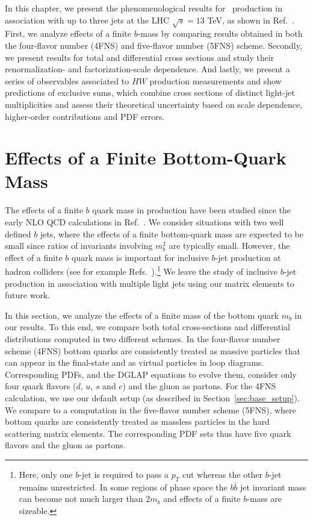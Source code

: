 In this chapter, we present the phenomenological results for
\Wbb~production in association with up to three jets at the LHC
$\sqrt{s}=13$ TeV, as shown in Ref.~\cite{wbbpaper}. First, we analyze
effects of a finite $b$-mass by comparing results obtained in both the
four-flavor number (4FNS) and five-flavor number (5FNS)
scheme. Secondly, we present results for total and differential cross
sections and study their renormalization- and factorization-scale
dependence. And lastly, we present a series of
observables associated to $HW$ production measurements and show predictions
of exclusive sums, which combine cross sections of distinct light-jet multiplicities 
and assess
their theoretical uncertainty based on scale dependence, higher-order
contributions and PDF errors. 

\section{Effects of a Finite Bottom-Quark Mass}
\label{sec:bmass}
The effects of a finite $b$ quark mass in \Wbb{} production have been studied since the early NLO QCD
calculations in Ref.~\cite{FebresCordero:2006sj}. We consider situations with two
well defined $b$ jets, where the effects of a finite bottom-quark mass are expected to be small since ratios of invariants involving $m_b^2$ are typically small. However, the effect of a finite $b$ quark mass is important for inclusive $b$-jet
production at hadron colliders (see for example Refs.~\cite{Campbell:2006cu,Campbell:2008hh,Caola:2011pz}).\footnote{Here, only one $b$-jet is required to pass a $p_T$ cut whereas the other $b$-jet remains unrestricted. In some regions of phase space the $b\bar{b}$ jet invariant mass can become not much larger than $2m_b$ and effects of a finite $b$-mass are sizeable.} We leave the study of inclusive $b$-jet production in association with multiple light jets using our matrix elements to future work. 

In this section, we analyze the effects of a finite mass of the bottom quark
$m_b$ in our results. To this end, we compare both total cross-sections and
differential distributions computed in two different schemes. In the
four-flavor number scheme (4FNS) bottom quarks are consistently
treated as massive particles that can appear in the final-state and as virtual particles in loop diagrams. Corresponding PDFs, and the DGLAP
equations to evolve them, consider only four quark flavors ($d$, $u$, $s$ and
$c$) and the gluon as partons. For the 4FNS calculation, we use our default setup (as
described in Section~\ref{sec:base_setup}). We compare to a
computation in the five-flavor number scheme (5FNS), where bottom
quarks are consistently treated as massless particles in the hard scattering matrix
elements. The corresponding PDF sets thus have five quark flavors and the gluon
as partons. 


